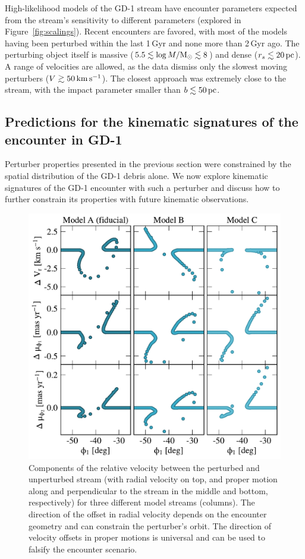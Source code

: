 \documentclass[twocolumn]{aastex62}
\begin{document}
High-likelihood models of the GD-1 stream have encounter parameters expected from the stream's sensitivity to different parameters (explored in Figure~\ref{fig:scalings}).
Recent encounters are favored, with most of the models having been perturbed within the last 1\,Gyr and none more than 2\,Gyr ago.
The perturbing object itself is massive ($5.5\lesssim\log M/\rm M_\odot\lesssim8$) and dense ($r_s\lesssim20\,\rm pc$).
A range of velocities are allowed, as the data dismiss only the slowest moving perturbers ($V\gtrsim50\,\rm km\,s^{-1}$).
The closest approach was extremely close to the stream, with the impact parameter smaller than $b\lesssim50\rm\,pc$.


\subsection{Predictions for the kinematic signatures of the encounter in GD-1}
\label{sec:kinematics}
Perturber properties presented in the previous section were constrained by the spatial distribution of the GD-1 debris alone.
We now explore kinematic signatures of the GD-1 encounter with such a perturber and discuss how to further constrain its properties with future kinematic observations.

\begin{figure}
\begin{center}
\includegraphics[width=\columnwidth]{kinematic_predictions.pdf}
\end{center}
\caption{Components of the relative velocity between the perturbed and unperturbed stream (with radial velocity on top, and proper motion along and perpendicular to the stream in the middle and bottom, respectively) for three different model streams (columns).
The direction of the offset in radial velocity depends on the encounter geometry and can constrain the perturber's orbit.
The direction of velocity offsets in proper motions is universal and can be used to falsify the encounter scenario.
}
\label{fig:predictions}
\end{figure}
\end{document}
